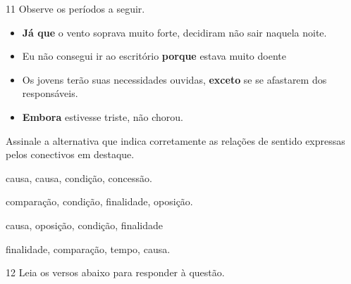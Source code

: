 \num{11} Observe os períodos a seguir.

\begin{itemize}

    \item \textbf{Já que} o vento soprava muito forte, decidiram não sair
naquela noite.

    \item Eu não consegui ir ao escritório \textbf{porque} estava muito doente

    \item Os jovens terão suas necessidades ouvidas, \textbf{exceto} se se
afastarem dos responsáveis.

    \item \textbf{Embora} estivesse triste, não chorou.

\end{itemize}

Assinale a alternativa que indica corretamente as relações de sentido
expressas pelos conectivos em destaque.

\begin{escolha}

    \item causa, causa, condição, concessão.

    \item comparação, condição, finalidade, oposição.

    \item causa, oposição, condição, finalidade

    \item finalidade, comparação, tempo, causa.

\end{escolha}

\num{12} Leia os versos abaixo para responder à questão. 

